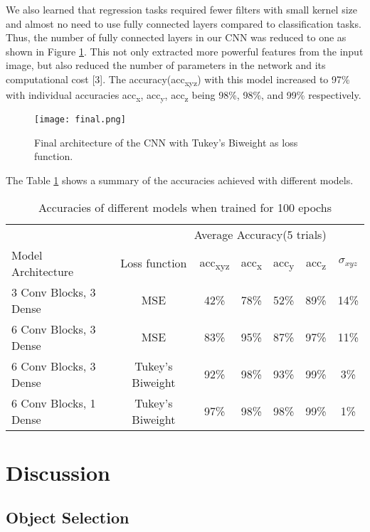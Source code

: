 \documentclass{article}
\begin{document}
We also learned that regression tasks required fewer filters with small kernel size and almost no need to use fully connected layers compared to classification tasks. Thus, the number of fully connected layers in our CNN was reduced to one as shown in Figure \ref{fig:model3}. This not only extracted more powerful features from the input image, but also reduced the number of parameters in the network and its computational cost [3]. The accuracy(acc\textsubscript{xyz}) with this model increased to 97\% with individual accuracies acc\textsubscript{x}, acc\textsubscript{y}, acc\textsubscript{z} being 98\%, 98\%, and 99\% respectively.

\begin{figure}[ht]
  \centering
  \texttt{[image: final.png]}
  \caption{Final architecture of the CNN with Tukey's Biweight as loss function.}
  \label{fig:model3}
\end{figure}

The Table \ref{acc-table} shows a summary of the accuracies achieved with different models.

\begin{table}[t]
  \caption{Accuracies of different models when trained for 100 epochs}
  \label{acc-table}
  \centering
  \begin{tabular}{lcccccc}
    \toprule
    \multicolumn{6}{r}{Average Accuracy(5 trials)}                   \\
    \cmidrule{3-7}
    Model Architecture & Loss function & acc\textsubscript{xyz }& acc\textsubscript{x} & acc\textsubscript{y} & acc\textsubscript{z} & $\sigma_{xyz}$\\
    \midrule
    3 Conv Blocks, 3 Dense & MSE  & 42\% & 78\% & 52\% & 89\% & 14\%\\
    6 Conv Blocks, 3 Dense & MSE & 83\% & 95\% & 87\% & 97\% & 11\%\\
    6 Conv Blocks, 3 Dense & Tukey's Biweight & 92\% & 98\% & 93\% & 99\% & 3\% \\
    6 Conv Blocks, 1 Dense & Tukey's Biweight & 97\% & 98\% & 98\% & 99\% & 1\% \\
    \bottomrule
  \end{tabular}
\end{table}

\section{Discussion}
\label{discussion}
\subsection{Object Selection}
\end{document}
